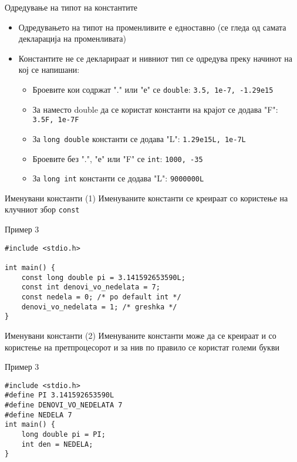 \begin{frame}{Одредување на типот на константите}
\begin{itemize}
\item Одредувањето на типот на променливите е едноставно (се гледа од самата декларација на променливата)
\item Константите не се декларираат и нивниот тип се одредува преку начинот на кој се напишани:
\begin{itemize}
\item Броевите кои содржат "." или "е" се {\color{blue}\texttt{double}}: \texttt{3.5, 1е-7, -1.29е15}
\item За наместо double да се користат {} константи на крајот се додава "F": \texttt{3.5F, 1e-7F}
\item За {\color{blue}\texttt{long double}} константи се додава "L": \texttt{1.29е15L, 1e-7L}
\item Броевите без ".", "е" или "F" се {\color{blue}\texttt{int}}: \texttt{1000, -35}
\item За {\color{blue}\texttt{long int}} константи се додава "L": \texttt{9000000L}
\end{itemize}
\end{itemize}
\end{frame}

\begin{frame}[fragile]{Именувани константи (1)}
\Large{Именуваните константи се креираат со користење на клучниот збор \texttt{const}}
\begin{exampleblock}{Пример 3}
\begin{lstlisting}
#include <stdio.h>

int main() {
    const long double pi = 3.141592653590L;
    const int denovi_vo_nedelata = 7;
    const nedela = 0; /* po default int */
    denovi_vo_nedelata = 1; /* greshka */
}
\end{lstlisting}
    \end{exampleblock}
\end{frame}

\begin{frame}[fragile]{Именувани константи (2)}
Именуваните константи може да се креираат и со користење на претпроцесорот и за нив по правило се користат големи букви
    \begin{exampleblock}{Пример 3}
\begin{lstlisting}
#include <stdio.h>
#define PI 3.141592653590L
#define DENOVI_VO_NEDELATA 7
#define NEDELA 7        
int main() {
    long double pi = PI;
    int den = NEDELA;
}
\end{lstlisting}
    \end{exampleblock}
\end{frame}

